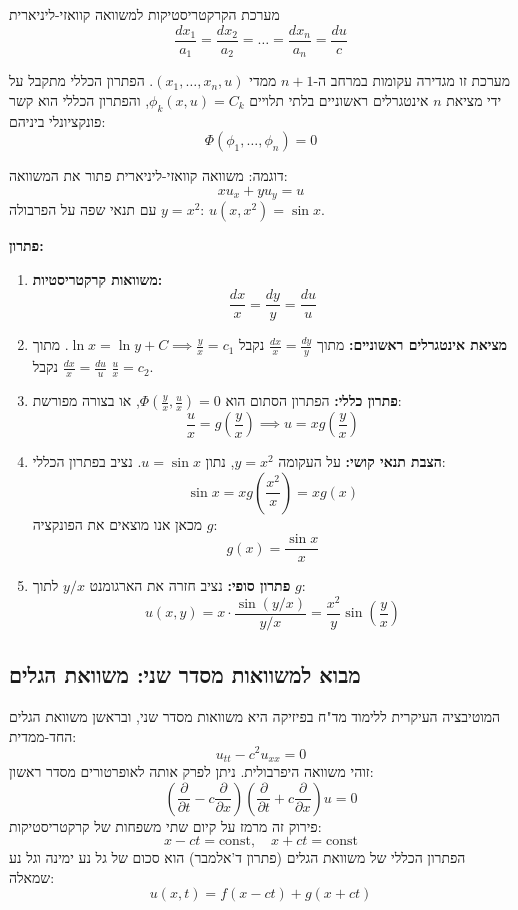 \begin{resultbox}{מערכת הקרקטריסטיקות למשוואה קוואזי-ליניארית}
\[
\frac{dx_1}{a_1} = \frac{dx_2}{a_2} = \dots = \frac{dx_n}{a_n} = \frac{du}{c}
\]
\end{resultbox}
מערכת זו מגדירה עקומות במרחב ה-$n+1$ ממדי $(x_1, \dots, x_n, u)$. הפתרון הכללי מתקבל על ידי מציאת $n$ אינטגרלים ראשוניים בלתי תלויים $\phi_k(x,u) = C_k$, והפתרון הכללי הוא קשר פונקציונלי ביניהם:
\[ \Phi(\phi_1, \dots, \phi_n) = 0 \]

\begin{examplebox}{דוגמה: משוואה קוואזי-ליניארית}
פתור את המשוואה:
\[ x u_x + y u_y = u \]
עם תנאי שפה על הפרבולה $y=x^2$: $u(x, x^2) = \sin x$.

\textbf{פתרון:}
\begin{enumerate}
    \item \textbf{משוואות קרקטריסטיות:}
    \[ \frac{dx}{x} = \frac{dy}{y} = \frac{du}{u} \]
    \item \textbf{מציאת אינטגרלים ראשוניים:}
    מתוך $\frac{dx}{x} = \frac{dy}{y}$ נקבל $\ln x = \ln y + C \implies \frac{y}{x} = c_1$.
    מתוך $\frac{dx}{x} = \frac{du}{u}$ נקבל $\frac{u}{x} = c_2$.
    \item \textbf{פתרון כללי:}
    הפתרון הסתום הוא $\Phi(\frac{y}{x}, \frac{u}{x}) = 0$, או בצורה מפורשת:
    \[ \frac{u}{x} = g\left(\frac{y}{x}\right) \implies u = x g\left(\frac{y}{x}\right) \]
    \item \textbf{הצבת תנאי קושי:}
    על העקומה $y=x^2$, נתון $u=\sin x$. נציב בפתרון הכללי:
    \[ \sin x = x g\left(\frac{x^2}{x}\right) = x g(x) \]
    מכאן אנו מוצאים את הפונקציה $g$:
    \[ g(x) = \frac{\sin x}{x} \]
    \item \textbf{פתרון סופי:}
    נציב חזרה את הארגומנט $y/x$ לתוך $g$:
    \[ u(x,y) = x \cdot \frac{\sin(y/x)}{y/x} = \frac{x^2}{y} \sin\left(\frac{y}{x}\right) \]
\end{enumerate}
\end{examplebox}

\subsection{מבוא למשוואות מסדר שני: משוואת הגלים}

המוטיבציה העיקרית ללימוד מד"ח בפיזיקה היא משוואות מסדר שני, ובראשן משוואת הגלים החד-ממדית:
\[
u_{tt} - c^2 u_{xx} = 0
\]
זוהי משוואה היפרבולית. ניתן לפרק אותה לאופרטורים מסדר ראשון:
\[
\left(\frac{\partial}{\partial t} - c\frac{\partial}{\partial x}\right)\left(\frac{\partial}{\partial t} + c\frac{\partial}{\partial x}\right)u = 0
\]
פירוק זה מרמז על קיום שתי משפחות של קרקטריסטיקות:
\[
x - ct = \text{const}, \quad x + ct = \text{const}
\]
הפתרון הכללי של משוואת הגלים (פתרון ד'אלמבר) הוא סכום של גל נע ימינה וגל נע שמאלה:
\[
u(x,t) = f(x - ct) + g(x + ct)
\]

